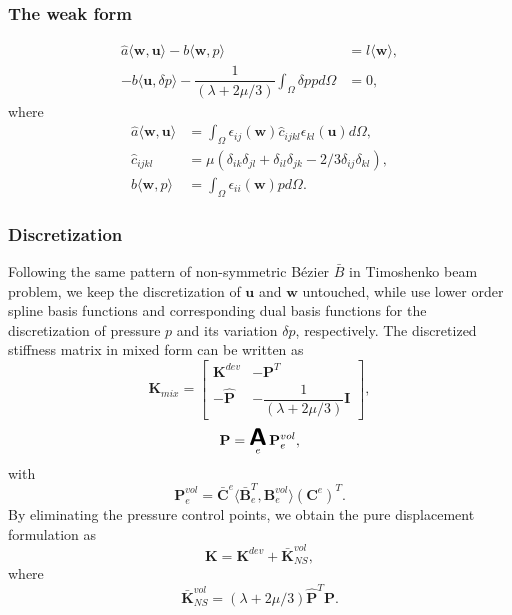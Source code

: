 \documentclass{article}
\DeclareMathOperator*{\A}{ \mathlarger{\mathlarger{\mathlarger{\boldsymbol{\mathsf{A}}}}} }
\newcommand{\Bezier}{{B\'{e}zier} }
\begin{document}
\subsubsection{The weak form}
\begin{align}
    \hat{a}\langle{\mathbf{w},\mathbf{u}}\rangle-b\langle{\mathbf{w},p}\rangle&=l\langle{\mathbf{w}}\rangle, \\
    - b\langle{\mathbf{u},\delta{p}}\rangle-\dfrac{1}{(\lambda+2\mu/3)}\int_{\Omega}\delta{p}pd\Omega&=0,
\end{align}
where
\begin{align}
    \hat{a}\langle{\mathbf{w},\mathbf{u}}\rangle&=\int_{\Omega}\epsilon_{ij}(\mathbf{w})\hat{c}_{ijkl}\epsilon_{kl}(\mathbf{u})d\Omega,\\
    \hat{c}_{ijkl}&=\mu\left(\delta_{ik}\delta_{jl}+\delta_{il}\delta_{jk}-2/3\delta_{ij}\delta_{kl}\right),\\
    b\langle{\mathbf{w},p}\rangle&=\int_{\Omega}\epsilon_{ii}(\mathbf{w})pd\Omega.
\end{align}

\subsubsection{Discretization}

Following the same pattern of non-symmetric \Bezier $\bar{B}$ in Timoshenko beam problem, we keep the discretization of $\mathbf{u}$ and $\mathbf{w}$ untouched, while use lower order spline basis functions and corresponding dual basis functions for the discretization of pressure $p$ and its variation $\delta{p}$, respectively. The discretized stiffness matrix in mixed form can be written as
\begin{equation}
    \mathbf{K}_{mix}=
    \begin{bmatrix}
        \mathbf{K}^{dev} & -\mathbf{P}^{T}\\
        -\hat{\mathbf{P}} & -\dfrac{1}{(\lambda+2\mu/3)}\mathbf{I}
    \end{bmatrix},
\end{equation}
\begin{equation}
    \mathbf{P}=\A_e\mathbf{P}_e^{vol},
\end{equation}
with
\begin{equation}
    \mathbf{P}_e^{vol}=\bar{\mathbf{C}}^e\langle{\bar{\mathbf{B}}_e^T,\mathbf{B}^{vol}_e}\rangle(\mathbf{C}^e)^T.
\end{equation}
By eliminating the pressure control points, we obtain the pure displacement formulation as
\begin{equation}
	\mathbf{K} = \mathbf{K}^{dev} + \bar{\mathbf{K}}^{vol}_{NS},
\end{equation}
where
\begin{equation}
    \bar{\mathbf{K}}^{vol}_{NS}=(\lambda+2\mu/3)\hat{\mathbf{P}}^T{\mathbf{P}}.
\end{equation}
\end{document}

